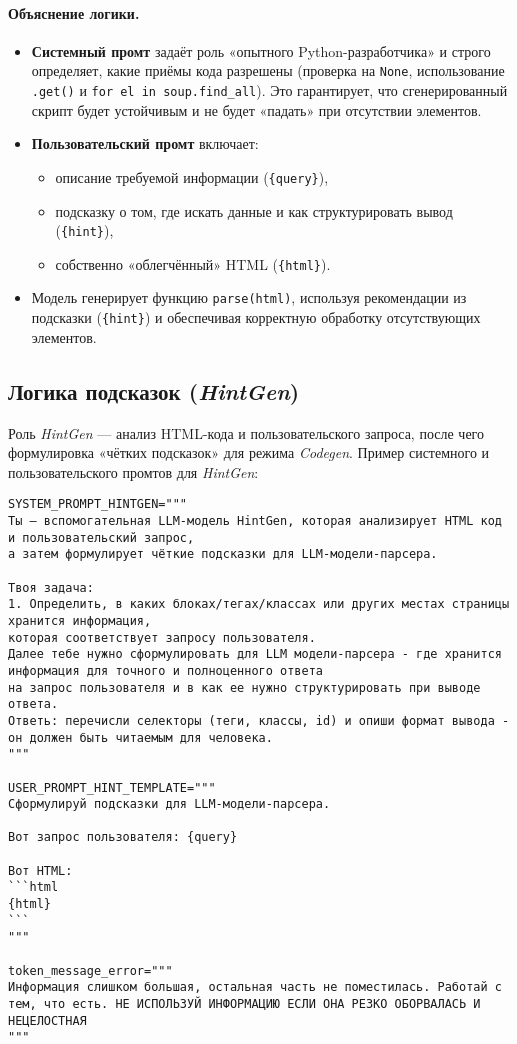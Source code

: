 \paragraph{Объяснение логики.}
\begin{itemize}
\item \textbf{Системный промт} задаёт роль «опытного Python-разработчика» и строго определяет, какие приёмы кода разрешены (проверка на \texttt{None}, использование \verb|.get()| и \verb|for el in soup.find_all|). Это гарантирует, что сгенерированный скрипт будет устойчивым и не будет «падать» при отсутствии элементов.
\item \textbf{Пользовательский промт} включает:
\begin{itemize}
\item описание требуемой информации (\verb|{query}|),
\item подсказку о том, где искать данные и как структурировать вывод (\verb|{hint}|),
\item собственно «облегчённый» HTML (\verb|{html}|).
\end{itemize}
\item Модель генерирует функцию \texttt{parse(html)}, используя рекомендации из подсказки (\verb|{hint}|) и обеспечивая корректную обработку отсутствующих элементов.
\end{itemize}

\subsection{Логика подсказок (\emph{HintGen})}

Роль \emph{HintGen} — анализ HTML-кода и пользовательского запроса, после чего формулировка «чётких подсказок» для режима \emph{Codegen}. Пример системного и пользовательского промтов для \emph{HintGen}:

\begin{verbatim}
SYSTEM_PROMPT_HINTGEN="""
Ты — вспомогательная LLM-модель HintGen, которая анализирует HTML код и пользовательский запрос,
а затем формулирует чёткие подсказки для LLM-модели-парсера.

Твоя задача:
1. Определить, в каких блоках/тегах/классах или других местах страницы хранится информация,
которая соответствует запросу пользователя.
Далее тебе нужно сформулировать для LLM модели-парсера - где хранится информация для точного и полноценного ответа
на запрос пользователя и в как ее нужно структурировать при выводе ответа.
Ответь: перечисли селекторы (теги, классы, id) и опиши формат вывода - он должен быть читаемым для человека.
"""

USER_PROMPT_HINT_TEMPLATE="""
Сформулируй подсказки для LLM-модели-парсера.

Вот запрос пользователя: {query}

Вот HTML:
```html
{html}
```
"""

token_message_error="""
Информация слишком большая, остальная часть не поместилась. Работай с тем, что есть. НЕ ИСПОЛЬЗУЙ ИНФОРМАЦИЮ ЕСЛИ ОНА РЕЗКО ОБОРВАЛАСЬ И НЕЦЕЛОСТНАЯ
"""
\end{verbatim}

